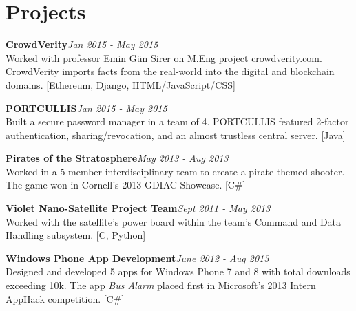 \documentclass[11pt,letterpaper,sans]{moderncv}
\newenvironment{pzentry}[3]
{\textbf{#1}\notblank{#2}{\textit{~- #2}}{}\hfill\textit{#3}\\\normalsize}
{\bigskip}
\begin{document}
\section{Projects} %

\begin{pzentry}{CrowdVerity}{}{Jan 2015 - May 2015}
Worked with professor Emin G\"{u}n Sirer on M.Eng project \href{http://crowdverity.com/}{crowdverity.com}.
CrowdVerity imports facts from the real-world into the digital and blockchain domains.
[Ethereum, Django, HTML/JavaScript/CSS]
\end{pzentry}

\begin{pzentry}{PORTCULLIS}{}{Jan 2015 - May 2015}
Built a secure password manager in a team of 4.
PORTCULLIS featured 2-factor authentication, sharing/revocation, and an almost trustless central server.
[Java]
\end{pzentry}

\begin{pzentry}{Pirates of the Stratosphere}{}{May 2013 - Aug 2013}
Worked in a 5 member interdisciplinary team to create a pirate-themed shooter.
The game won in Cornell's 2013 GDIAC Showcase.
[C\#]
\end{pzentry}


\begin{pzentry}{Violet Nano-Satellite Project Team}{}{Sept 2011 - May 2013}
Worked with the satellite's power board within the team's Command and Data Handling subsystem.
[C, Python]
\end{pzentry}

\begin{pzentry}{Windows Phone App Development}{}{June 2012 - Aug 2013}
Designed and developed 5 apps for Windows Phone 7 and 8 with total downloads exceeding 10k.
The app \emph{Bus Alarm} placed first in Microsoft's 2013 Intern AppHack competition.
[C\#]
\end{pzentry}





\end{document}

